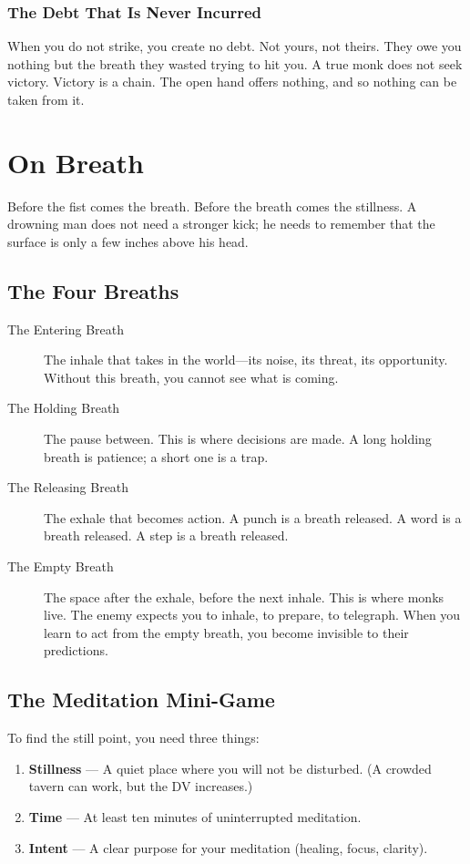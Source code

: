 \documentclass[11pt]{book}
\begin{document}
\subsection{The Debt That Is Never Incurred}

When you do not strike, you create no debt. Not yours, not theirs. They owe you nothing but the breath they wasted trying to hit you. A true monk does not seek victory. Victory is a chain. The open hand offers nothing, and so nothing can be taken from it.

\chapter{On Breath}

Before the fist comes the breath. Before the breath comes the stillness. A drowning man does not need a stronger kick; he needs to remember that the surface is only a few inches above his head.

\section{The Four Breaths}

\begin{description}
    \item[The Entering Breath] The inhale that takes in the world---its noise, its threat, its opportunity. Without this breath, you cannot see what is coming.
    \item[The Holding Breath] The pause between. This is where decisions are made. A long holding breath is patience; a short one is a trap.
    \item[The Releasing Breath] The exhale that becomes action. A punch is a breath released. A word is a breath released. A step is a breath released.
    \item[The Empty Breath] The space after the exhale, before the next inhale. This is where monks live. The enemy expects you to inhale, to prepare, to telegraph. When you learn to act from the empty breath, you become invisible to their predictions.
\end{description}

\section{The Meditation Mini-Game}

To find the still point, you need three things:

\begin{enumerate}
    \item \textbf{Stillness} --- A quiet place where you will not be disturbed. (A crowded tavern can work, but the DV increases.)
    \item \textbf{Time} --- At least ten minutes of uninterrupted meditation.
    \item \textbf{Intent} --- A clear purpose for your meditation (healing, focus, clarity).
\end{enumerate}
\end{document}
